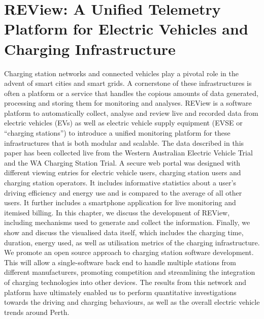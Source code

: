 
\chapter[REView]{REView: A Unified Telemetry Platform for Electric Vehicles and Charging Infrastructure}
\label{ch:review}

\ifpdf
	\graphicspath{{Chapter9/Figs/Raster/}{Chapter9/Figs/PDF/}{Chapter9/Figs/}}
\else
	\graphicspath{{Chapter9/Figs/Vector/}{Chapter9/Figs/}}
\fi

Charging station networks and connected vehicles play a pivotal role in the advent of smart cities and smart grids. A cornerstone of these infrastructures is often a platform or a service that handles the copious amounts of data generated, processing and storing them for monitoring and analyses. REView is a software platform to automatically collect, analyse and review live and recorded data from electric vehicles (EVs) as well as electric vehicle supply equipment (EVSE or “charging stations”) to introduce a unified monitoring platform for these infrastructures that is both modular and scalable. The data described in this paper has been collected live from the Western Australian Electric Vehicle Trial and the WA Charging Station Trial. A secure web portal was designed with different viewing entries for electric vehicle users, charging station users and charging station operators. It includes informative statistics about a user’s driving efficiency and energy use and is compared to the average of all other users. It further includes a smartphone application for live monitoring and itemised billing. In this chapter, we discuss the development of REView, including mechanisms used to generate and collect the information. Finally, we show and discuss the visualised data itself, which includes the charging time, duration, energy used, as well as utilisation metrics of the charging infrastructure. We promote an open source approach to charging station software development. This will allow a single-software back end to handle multiple stations from different manufacturers, promoting competition and streamlining the integration of charging technologies into other devices. The results from this network and platform have ultimately enabled us to perform quantitative investigations towards the driving and charging behaviours, as well as the overall electric vehicle trends around Perth.


